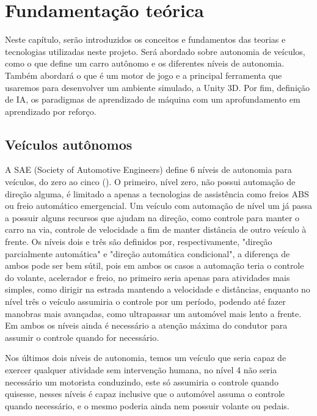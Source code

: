 \chapter{Fundamentação teórica}
Neste capítulo, serão introduzidos os conceitos e fundamentos das teorias e tecnologias utilizadas neste projeto. Será abordado sobre autonomia de veículos, como o que define um carro autônomo e os diferentes níveis de autonomia. Também abordará o que é um motor de jogo e a principal ferramenta que usaremos para desenvolver um ambiente simulado, a Unity 3D. Por fim, definição de IA, os paradigmas de aprendizado de máquina com um aprofundamento em aprendizado por reforço.

\section{Veículos autônomos}
A SAE (Society of Automotive Engineers) define 6 níveis de autonomia para veículos, do zero ao cinco (). O primeiro, nível zero, não possui automação de direção alguma, é limitado a apenas a tecnologias de assistência como freios ABS ou freio automático emergencial. Um veículo com automação de nível um já passa a possuir alguns recursos que ajudam na direção, como controle para manter o carro na via, controle de velocidade a fim de manter distância de outro veículo à frente. Os níveis dois e três são definidos por, respectivamente, "direção parcialmente automática"{} e "direção automática condicional", a diferença de ambos pode ser bem sútil, pois em ambos os casos a automação teria o controle do volante, acelerador e freio, no primeiro seria apenas para atividades mais simples, como dirigir na estrada mantendo a velocidade e distâncias, enquanto no nível três o veículo assumiria o controle por um período, podendo até fazer manobras mais avançadas, como ultrapassar um automóvel mais lento a frente. Em ambos os níveis ainda é necessário a atenção máxima do condutor para assumir o controle quando for necessário.

Nos últimos dois níveis de autonomia, temos um veículo que seria capaz de exercer qualquer atividade sem intervenção humana, no nível 4 não seria necessário um motorista conduzindo, este só assumiria o controle quando quisesse, nesses níveis é capaz inclusive que o automóvel assuma o controle quando necessário, e o mesmo poderia ainda nem possuir volante ou pedais.

